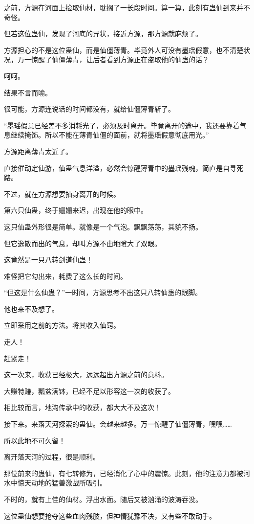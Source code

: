 \begin{this_body}
之前，方源在河面上捡取仙材，耽搁了一长段时间。算一算，此刻有蛊仙到来并不奇怪。

但若这位蛊仙，发现了河底的异状，接近方源，那方源就麻烦了。

方源担心的不是这位蛊仙，而是仙僵薄青。毕竟外人可没有墨瑶假意，也不清楚状况，万一惊醒了仙僵薄青，让后者看到方源正在盗取他的仙蛊的话？

呵呵。

结果不言而喻。

很可能，方源连说话的时间都没有，就给仙僵薄青斩了。

“墨瑶假意已经差不多消耗光了，必须及时离开。毕竟离开的途中，我还要靠着气息继续掩饰。所以不能在薄青仙僵的面前，就将墨瑶假意彻底用光。”

方源距离薄青太近了。

直接催动定仙游，仙蛊气息洋溢，必然会惊醒薄青中的墨瑶残魂，简直是自寻死路。

不过，就在方源想要抽身离开的时候。

第六只仙蛊，终于姗姗来迟，出现在他的眼中。

这只仙蛊外形很是简单。就像是一个气泡。飘飘荡荡，其貌不扬。

但它逸散而出的气息，却叫方源不由地瞪大了双眼。

这竟然是一只八转剑道仙蛊！

难怪把它勾出来，耗费了这么长的时间。

“但这是什么仙蛊？”一时间，方源思考不出这只八转仙蛊的跟脚。

他也来不及想了。

立即采用之前的方法。将其收入仙窍。

走人！

赶紧走！

这一次来，收获已经极大，远远超出方源之前的意料。

大赚特赚，瓢盆满钵，已经不足以形容这一次的收获了。

相比较而言，地沟传承中的收获，都大大不及这次！

接下来。来落天河探索的蛊仙。会越来越多。万一惊醒了仙僵薄青，嘿嘿……

所以此地不可久留！

离开落天河的过程，很是顺利。

那位前来的蛊仙，有七转修为，已经消化了心中的震惊。此刻，他的注意力都被河水中惊天动地的猛兽激战所吸引。

不时的，就有上佳的仙材。浮出水面。随后又被汹涌的波涛吞没。

这位蛊仙想要抢夺这些血肉残肢，但神情犹豫不决，又有些不敢动手。


\end{this_body}
